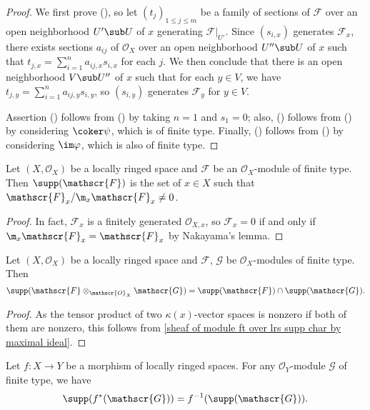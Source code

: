 \begin{proof}
We first prove (), so let $(t_j)_{1\leq j\leq m}$ be a family of sections of $\mathscr{F}$ over an open neighborhood $U'\sub U$ of $x$ generating $\mathscr{F}|_{U'}$. Since $(s_{i,x})$ generates $\mathscr{F}_x$, there exists sections $a_{ij}$ of $\mathscr{O}_X$ over an open neighborhood $U''\sub U$ of $x$ such that $t_{j,x}=\sum_{i=1}^{n}a_{ij,x}s_{i,x}$ for each $j$. We then conclude that there is an open neighborhood $V\sub U''$ of $x$ such that for each $y\in V$, we have $t_{j,y}=\sum_{i=1}^{n}a_{ij,y}s_{i,y}$, so $(s_{i,y})$ generates $\mathscr{F}_y$ for $y\in V$.\par
Assertion () follows from () by taking $n=1$ and $s_1=0$; also, () follows from () by considering $\coker\psi$, which is of finite type. Finally, () follows from () by considering $\im\varphi$, which is also of finite type. 
\end{proof}
\begin{corollary}\label{sheaf of module ft over lrs supp char by maximal ideal}
Let $(X,\mathscr{O}_X)$ be a locally ringed space and $\mathscr{F}$ be an $\mathscr{O}_X$-module of finite type. Then $\supp(\mathscr{F})$ is the set of $x\in X$ such that $\mathscr{F}_x/\m_x\mathscr{F}_x\neq 0$.
\end{corollary}
\begin{proof}
In fact, $\mathscr{F}_x$ is a finitely generated $\mathscr{O}_{X,x}$, so $\mathscr{F}_x=0$ if and only if $\m_x\mathscr{F}_x=\mathscr{F}_x$ by Nakayama's lemma.
\end{proof}
\begin{corollary}\label{sheaf of module ft over lrs supp of tensor}
Let $(X,\mathscr{O}_X)$ be a locally ringed space and $\mathscr{F}$, $\mathscr{G}$ be $\mathscr{O}_X$-modules of finite type. Then
\[\supp(\mathscr{F}\otimes_{\mathscr{O}_X}\mathscr{G})=\supp(\mathscr{F})\cap\supp(\mathscr{G}).\]
\end{corollary}
\begin{proof}
As the tensor product of two $\kappa(x)$-vector spaces is nonzero if both of them are nonzero, this follows from \cref{sheaf of module ft over lrs supp char by maximal ideal}.
\end{proof}
\begin{corollary}
Let $f:X\to Y$ be a morphism of locally ringed spaces. For any $\mathscr{O}_Y$-module $\mathscr{G}$ of finite type, we have
\[\supp(f^*(\mathscr{G}))=f^{-1}(\supp(\mathscr{G})).\]
\end{corollary}
